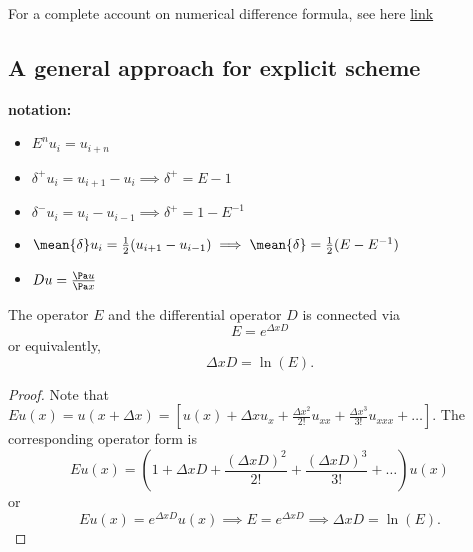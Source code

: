 \begin{refsection}
\begin{remark}
	For a complete account on numerical difference formula, see here \href{https://en.wikipedia.org/wiki/Finite_difference_coefficient}{link}
\end{remark}

\subsection{A general approach for explicit scheme}
\begin{mdframed}
\textbf{notation:}\\
\begin{itemize}
	\item $E^n u_i = u_{i+n}$
	\item $\delta^+u_i = u_{i+1}-u_i \implies \delta^+ = E-1$
	\item $\delta^-u_i = u_{i}-u_{i-1} \implies \delta^+ = 1-E^{-1}$
	\item $\mean{\delta}u_i = \frac{1}{2}(u_{i+1} - u_{i-1})\implies \mean{\delta} = \frac{1}{2}(E - E^{-1})$
	\item $Du = \frac{\Pa u}{\Pa x}$
\end{itemize}
\end{mdframed}

\begin{lemma}\cite[287]{karniadakis2003parallel}
The operator $E$ and the differential operator $D$ is connected via
$$ E = e^{\Delta x D} $$
or equivalently, 
$$ \Delta x D = \ln(E).$$
\end{lemma}
\begin{proof}
Note that 
$Eu(x) = u(x+\Delta x) = [u(x) + \Delta x u_x + \frac{\Delta x^2}{2!} u_{xx} + \frac{\Delta x^3}{3!} u_{xxx} + \dots]$.
The corresponding operator form is
$$Eu(x) = (1 + \Delta x D + \frac{(\Delta x D)^2}{2!} + \frac{(\Delta x D)^3}{3!} + \dots) u(x)$$
or
$$Eu(x) = e^{\Delta x D} u(x) \implies E = e^{\Delta x D} \implies \Delta x D = \ln(E).$$	
\end{proof}




\end{refsection}
